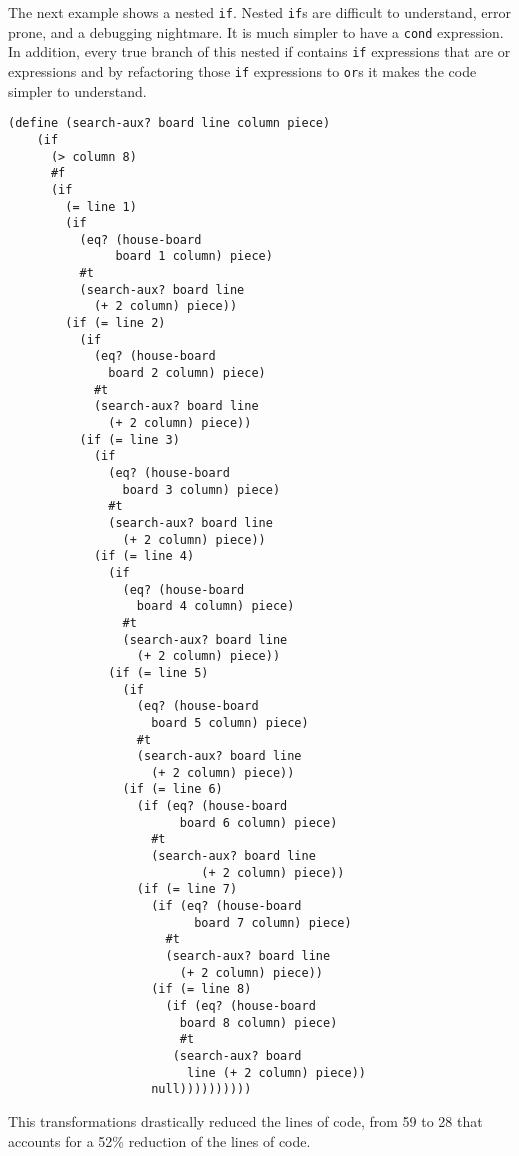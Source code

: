 The next example shows a nested {\tt if}. Nested {\tt if}s are
 difficult to understand, error prone, and a debugging nightmare.
It is much simpler to have a {\tt cond} expression.
In addition, every true branch of this nested if contains {\tt if} expressions that are
or expressions and by refactoring those {\tt if} expressions to {\tt or}s it makes the code
simpler to understand.
\begin{lstlisting}[basicstyle=\ttfamily]
  (define (search-aux? board line column piece)
    (if
      (> column 8)
      #f
      (if
        (= line 1)
        (if
          (eq? (house-board
               board 1 column) piece)
          #t
          (search-aux? board line
            (+ 2 column) piece))
        (if (= line 2)
          (if
            (eq? (house-board
              board 2 column) piece)
            #t
            (search-aux? board line
              (+ 2 column) piece))
          (if (= line 3)
            (if
              (eq? (house-board
                board 3 column) piece)
              #t
              (search-aux? board line
                (+ 2 column) piece))
            (if (= line 4)
              (if
                (eq? (house-board
                  board 4 column) piece)
                #t
                (search-aux? board line
                  (+ 2 column) piece))
              (if (= line 5)
                (if
                  (eq? (house-board
                    board 5 column) piece)
                  #t
                  (search-aux? board line
                    (+ 2 column) piece))
                (if (= line 6)
                  (if (eq? (house-board
                        board 6 column) piece)
                    #t
                    (search-aux? board line
                           (+ 2 column) piece))
                  (if (= line 7)
                    (if (eq? (house-board
                          board 7 column) piece)
                      #t
                      (search-aux? board line
                        (+ 2 column) piece))
                    (if (= line 8)
                      (if (eq? (house-board
                        board 8 column) piece)
                        #t
                       (search-aux? board
                         line (+ 2 column) piece))
                    null))))))))))
\end{lstlisting}

This transformations drastically reduced the lines of code, from 59 to 28 that accounts
for a 52\% reduction of the lines of code.

